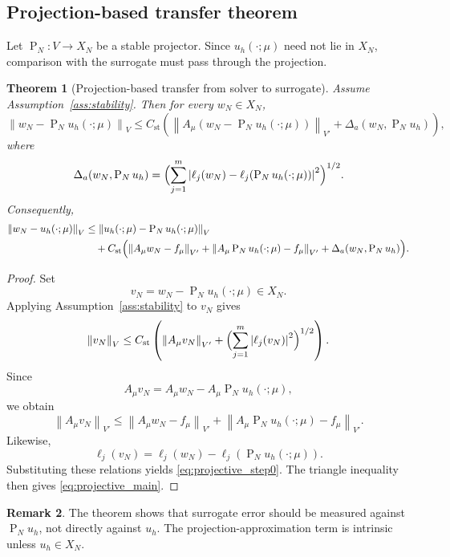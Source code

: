 \documentclass[preprint,12pt]{elsarticle}
\newtheorem{theorem}{Theorem}[section]
\theoremstyle{definition}
\newtheorem{remark}[theorem]{Remark}
\numberwithin{equation}{section}
\newcommand{\norm}[1]{\left\lVert #1 \right\rVert}
\newcommand{\abs}[1]{\left\lvert #1 \right\rvert}
\newcommand{\Proj}{\operatorname{P}}
\begin{document}
\subsection{Projection-based transfer theorem}

Let $\Proj_N:V\to X_N$ be a stable projector. Since $u_h(\cdot;\mu)$ need not lie in $X_N$, comparison with the surrogate must pass through the projection.

\begin{theorem}[Projection-based transfer from solver to surrogate]
\label{thm:mainstrict}
Assume Assumption~\ref{ass:stability}. Then for every $w_N\in X_N$,
\begin{equation}
\norm{w_N-\Proj_Nu_h(\cdot;\mu)}_V
\le
C_{\mathrm{st}}
\left(
\norm{A_\mu\!\left(w_N-\Proj_Nu_h(\cdot;\mu)\right)}_{V'}
+
\Delta_a(w_N,\Proj_Nu_h)
\right),
\label{eq:projective_step0}
\end{equation}
where
\[
\Delta_a(w_N,\Proj_Nu_h)=
\Bigl(
\sum_{j=1}^m
\abs{\ell_j(w_N)-\ell_j(\Proj_Nu_h(\cdot;\mu))}^2
\Bigr)^{1/2}.
\]
Consequently,
\begin{align}
\norm{w_N-u_h(\cdot;\mu)}_V
&\le
\norm{u_h(\cdot;\mu)-\Proj_Nu_h(\cdot;\mu)}_V
\notag\\
&\quad+
C_{\mathrm{st}}
\Bigl(
\norm{A_\mu w_N-f_\mu}_{V'}
+
\norm{A_\mu\Proj_Nu_h(\cdot;\mu)-f_\mu}_{V'}
+
\Delta_a(w_N,\Proj_Nu_h)
\Bigr).
\label{eq:projective_main}
\end{align}
\end{theorem}

\begin{proof}
Set
\[
v_N=w_N-\Proj_Nu_h(\cdot;\mu)\in X_N.
\]
Applying Assumption~\ref{ass:stability} to $v_N$ gives
\[
\norm{v_N}_V
\le
C_{\mathrm{st}}
\left(
\norm{A_\mu v_N}_{V'}
+
\Bigl(\sum_{j=1}^m \abs{\ell_j(v_N)}^2\Bigr)^{1/2}
\right).
\]
Since
\[
A_\mu v_N=A_\mu w_N-A_\mu \Proj_Nu_h(\cdot;\mu),
\]
we obtain
\[
\norm{A_\mu v_N}_{V'}
\le
\norm{A_\mu w_N-f_\mu}_{V'}
+
\norm{A_\mu \Proj_Nu_h(\cdot;\mu)-f_\mu}_{V'}.
\]
Likewise,
\[
\ell_j(v_N)=\ell_j(w_N)-\ell_j(\Proj_Nu_h(\cdot;\mu)).
\]
Substituting these relations yields \eqref{eq:projective_step0}. The triangle inequality then gives \eqref{eq:projective_main}.
\end{proof}

\begin{remark}
The theorem shows that surrogate error should be measured against $\Proj_Nu_h$, not directly against $u_h$. The projection-approximation term is intrinsic unless $u_h\in X_N$.
\end{remark}
\end{document}
